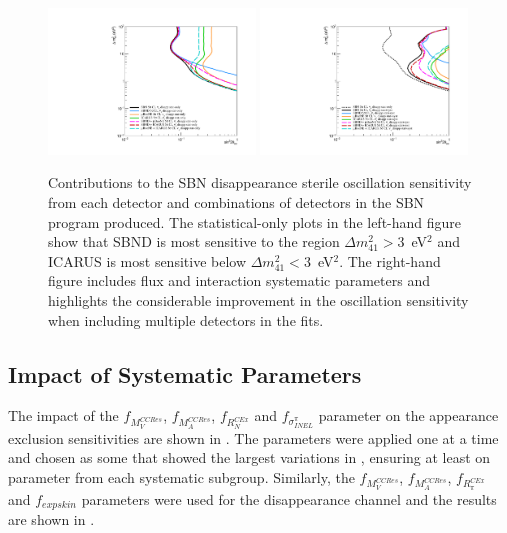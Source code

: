 \begin{figure}[h!]
    \centering
    \includegraphics[width = 0.49\textwidth]{figures-chap6/exclusion_contours/nue_disapp_detector_combinations_stat-only.pdf}
    \includegraphics[width = 0.49\textwidth]{figures-chap6/exclusion_contours/nue_disapp_detector_combinations_stat+syst.pdf}
    \caption[\nue disappearance sensitivities from different detector combinations.]{Contributions to the SBN \nue disappearance sterile oscillation sensitivity from each detector and combinations of detectors in the SBN program produced. The statistical-only plots in the left-hand figure show that SBND is most sensitive to the region $\Delta m_{41}^{2} > 3$~eV$^{2}$ and ICARUS is most sensitive below $\Delta m_{41}^{2} < 3$~eV$^{2}$. The right-hand figure includes flux and interaction systematic parameters and highlights the considerable improvement in the oscillation sensitivity when including multiple detectors in the fits.}
    \label{fig:nue_disapp_sensitivity_detector_contribution}
\end{figure}

\newpage

\subsection{Impact of Systematic Parameters}

The impact of the $f_{M_V^{CCRes}}$, $f_{M_A^{CCRes}}$, $f_{R_N^{C Ex}}$ and $f_{\sigma^{\pi}_{INEL}}$ parameter on the \nue appearance exclusion sensitivities are shown in . The parameters were applied one at a time and chosen as some that showed the largest variations in , ensuring at least on parameter from each systematic subgroup. Similarly, the $f_{M_V^{CCRes}}$, $f_{M_A^{CCRes}}$, $f_{R_{\pi}^{C Ex}}$ and $f_{expskin}$ parameters were used for the \nue disappearance channel and the results are shown in .

